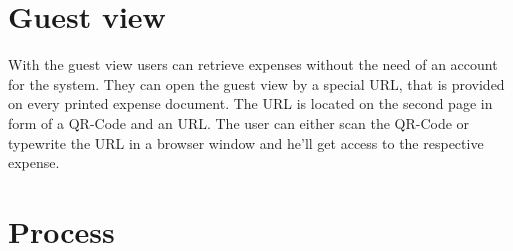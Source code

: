 \section{Guest view}
With the guest view users can retrieve expenses without the need of an account for the system. They can open the guest view by a special URL, that is provided on every printed expense document. The URL is located on the second page in form of a QR-Code and an URL. The user can either scan the QR-Code or typewrite the URL in a browser window and he'll get access to the respective expense.


\section{Process}
\label{sec:process}
